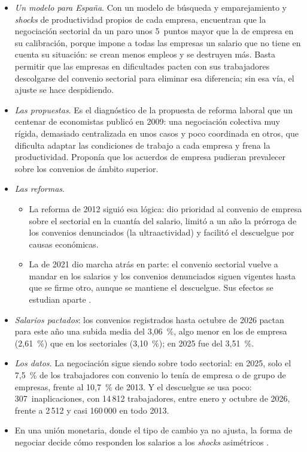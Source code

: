 \documentclass[11pt]{article}
\begin{document}
\begin{itemize}
\item \emph{Un modelo para España}. Con un modelo de búsqueda y emparejamiento y \emph{shocks} de productividad propios de cada empresa, \textcite{JimenoThomas2013Collective} encuentran que la negociación sectorial da un paro unos 5~puntos mayor que la de empresa en su calibración, porque impone a todas las empresas un salario que no tiene en cuenta su situación: se crean menos empleos y se destruyen más\nocite{JimenoThomas2011Collective}. Basta permitir que las empresas en dificultades pacten con sus trabajadores descolgarse del convenio sectorial para eliminar esa diferencia; sin esa vía, el ajuste se hace despidiendo.
\item \emph{Las propuestas}. Es el diagnóstico de la propuesta de reforma laboral que un centenar de economistas publicó en 2009: una negociación colectiva muy rígida, demasiado centralizada en unos casos y poco coordinada en otros, que dificulta adaptar las condiciones de trabajo a cada empresa y frena la productividad. Proponía que los acuerdos de empresa pudieran prevalecer sobre los convenios de ámbito superior\nocite{FEDEA2009Propuesta}.
\item \emph{Las reformas}.
  \begin{itemize}
  \item La reforma de 2012 siguió esa lógica: dio prioridad al convenio de empresa sobre el sectorial en la cuantía del salario, limitó a un año la prórroga de los convenios denunciados (la ultraactividad) y facilitó el descuelgue por causas económicas\nocite{BOE2012Ley3}.
  \item La de 2021 dio marcha atrás en parte: el convenio sectorial vuelve a mandar en los salarios y los convenios denunciados siguen vigentes hasta que se firme otro, aunque se mantiene el descuelgue\nocite{BOE2021RDL32,BOE2015ET}. Sus efectos se estudian aparte .
  \end{itemize}
\item \emph{Salarios pactados}: los convenios registrados hasta octubre de 2026 pactan para este año una subida media del 3,06~\%, algo menor en los de empresa (2,61~\%) que en los sectoriales (3,10~\%); en 2025 fue del 3,51~\%\nocite{MITES2026CCTOct}.
\item \emph{Los datos}. La negociación sigue siendo sobre todo sectorial: en 2025, solo el 7,5~\% de los trabajadores con convenio lo tenía de empresa o de grupo de empresas, frente al 10,7~\% de 2013. Y el descuelgue se usa poco: 307~inaplicaciones, con 14\,812 trabajadores, entre enero y octubre de 2026, frente a 2\,512 y casi 160\,000 en todo 2013\nocite{MITES2026CCTOct,MITES2026CCT2025}.
\item En una unión monetaria, donde el tipo de cambio ya no ajusta, la forma de negociar decide cómo responden los salarios a los \emph{shocks} asimétricos .
\end{itemize}
\end{document}
